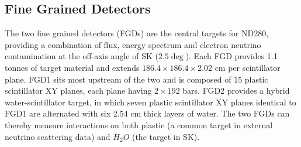 \subsection{Fine Grained Detectors}
The two fine grained detectors (FGDs)\cite{t2k_fgd} are the central targets for ND280, providing a combination of flux, energy spectrum and electron neutrino contamination at the off-axis angle of SK ($2.5\deg$). Each FGD provides 1.1 tonnes of target material and extends $186.4\times186.4\times2.02\text{ cm}$ per scintillator plane. FGD1 sits most upstream of the two and is composed of 15 plastic scintillator XY planes, each plane having $2\times192$ bars. FGD2 provides a hybrid water-scintillator target, in which seven plastic scintillator XY planes identical to FGD1 are alternated with six 2.54 cm thick layers of water. The two FGDs can thereby measure interactions on both plastic (a common target in external neutrino scattering data) and $H_2 O$ (the target in SK).

